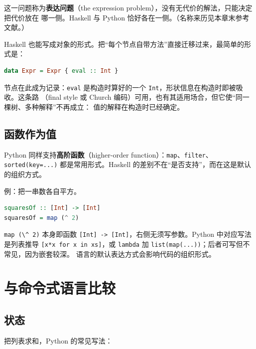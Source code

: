 这一问题称为\textbf{表达问题}（the expression problem），没有无代价的解法，只能决定把代价放在
哪一侧。Haskell 与 Python 恰好各在一侧。（名称来历见本章末参考文献。）

Haskell 也能写成对象的形式。把“每个节点自带方法”直接迁移过来，最简单的形式是：

\begin{lstlisting}[language=Haskell]
data Expr = Expr { eval :: Int }
\end{lstlisting}

节点在此成为记录：\passthrough{\lstinline!eval!} 是构造时算好的一个 \passthrough{\lstinline!Int!}，形状信息在构造时即被吸收。这条路
（final style 或 Church 编码）可用，也有其适用场合，但它使“同一棵树、多种解释”不再成立：
值的解释在构造时已经确定。

\subsection{函数作为值}\label{ux51fdux6570ux4f5cux4e3aux503c}

Python 同样支持\textbf{高阶函数}（higher-order function）：\passthrough{\lstinline!map!}、\passthrough{\lstinline!filter!}、\passthrough{\lstinline!sorted(key=...)!}
都是常用形式。Haskell 的差别不在“是否支持”，而在这是默认的组织方式。

例：把一串数各自平方。

\begin{lstlisting}[language=Haskell]
squaresOf :: [Int] -> [Int]
squaresOf = map (^ 2)
\end{lstlisting}

\passthrough{\lstinline!map (\^ 2)!} 本身即函数 \passthrough{\lstinline![Int] -> [Int]!}，右侧无须写参数。Python 中对应写法是列表推导
\passthrough{\lstinline![x*x for x in xs]!}，或 \passthrough{\lstinline!lambda!} 加 \passthrough{\lstinline!list(map(...))!}；后者可写但不常见，因为嵌套较深。
语言的默认表达方式会影响代码的组织形式。

\section{与命令式语言比较}\label{ux4e0eux547dux4ee4ux5f0fux8bedux8a00ux6bd4ux8f83}

\subsection{状态}\label{ux72b6ux6001}

把列表求和，Python 的常见写法：

